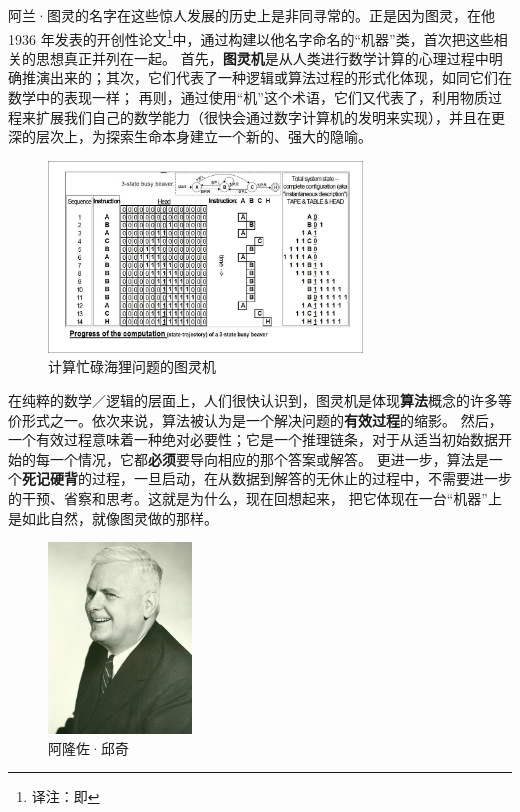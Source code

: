 \documentclass[a4paper,12pt]{article}
\begin{document}
阿兰·图灵的名字在这些惊人发展的历史上是非同寻常的。正是因为图灵，在他 1936 年发表的开创性论文\footnote[3]{译注：即\cite{TuringA1937}}中，通过构建以他名字命名的“机器”类，首次把这些相关的思想真正并列在一起。
首先，\textbf{\gls{图灵机}}是从人类进行数学计算的心理过程中明确推演出来的；其次，它们代表了一种逻辑或算法过程的形式化体现，如同它们在数学中的表现一样；
再则，通过使用“机”这个术语，它们又代表了，利用物质过程来扩展我们自己的数学能力（很快会通过数字计算机的发明来实现），并且在更深的层次上，为探索生命本身建立一个新的、强大的隐喻。

\begin{figure}[ht]
\centering
\includegraphics[height=2.0in]{images/turing_machine.jpg}
\caption{计算忙碌海狸问题的图灵机}
\end{figure}

在纯粹的数学／逻辑的层面上，人们很快认识到，图灵机是体现\textbf{\gls{算法}}概念的许多等价形式之一。依次来说，算法被认为是一个解决问题的\textbf{\gls{有效过程}}的缩影。
然后，一个有效过程意味着一种绝对必要性；它是一个推理链条，对于从适当初始数据开始的每一个情况，它都\textbf{必须}要导向相应的那个答案或解答。
更进一步，算法是一个\textbf{死记硬背}的过程，一旦启动，在从数据到解答的无休止的过程中，不需要进一步的干预、省察和思考。这就是为什么，现在回想起来，
把它体现在一台“机器”上是如此自然，就像图灵做的那样。

\begin{figure}
  \begin{center}
    \includegraphics[height=2.0in]{images/alonzo_church.jpg}
  \end{center}
  \caption{阿隆佐·邱奇}
\end{figure}
\end{document}
